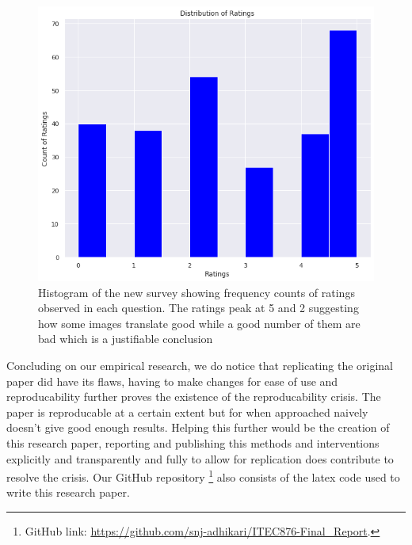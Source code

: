 \documentclass[preprint,12pt]{elsarticle}
\begin{document}
\begin{figure}[ht]
\centering\includegraphics[width=0.7\linewidth]{survey_2_summary.png}
\caption{Histogram of the new survey showing frequency counts of ratings observed in each question. The ratings peak at 5 and 2 suggesting how some images translate good while a good number of them are bad which is a justifiable conclusion}
\label{fig:Survey_update}
\end{figure}

Concluding on our empirical research, we do notice that replicating the original paper did have its flaws, having to make changes for ease of use and reproducability further proves the existence of the reproducability crisis. The paper is reproducable at a certain extent but for when approached naively doesn't give good enough results. Helping this further would be the creation of this research paper, reporting and publishing this methods and interventions explicitly and transparently and fully to allow for replication does contribute to resolve the crisis. Our GitHub repository \footnote{GitHub link: \url{https://github.com/snj-adhikari/ITEC876-Final_Report}.} also consists of the latex code used to write this research paper.


% 




\end{document}
